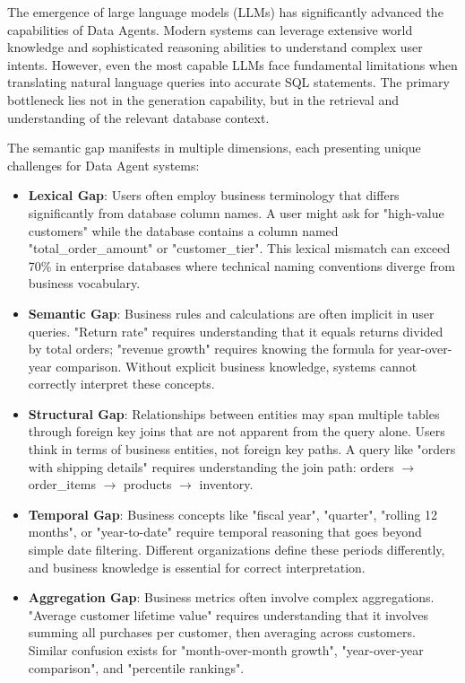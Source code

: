 \documentclass[sigconf, nonatbib]{acmart}
\begin{document}
The emergence of large language models (LLMs) has significantly advanced the capabilities of Data Agents. Modern systems can leverage extensive world knowledge and sophisticated reasoning abilities to understand complex user intents. However, even the most capable LLMs face fundamental limitations when translating natural language queries into accurate SQL statements. The primary bottleneck lies not in the generation capability, but in the retrieval and understanding of the relevant database context.

The semantic gap manifests in multiple dimensions, each presenting unique challenges for Data Agent systems:

\begin{itemize}
    \item \textbf{Lexical Gap}: Users often employ business terminology that differs significantly from database column names. A user might ask for "high-value customers" while the database contains a column named "total\_order\_amount" or "customer\_tier". This lexical mismatch can exceed 70\% in enterprise databases where technical naming conventions diverge from business vocabulary.
    
    \item \textbf{Semantic Gap}: Business rules and calculations are often implicit in user queries. "Return rate" requires understanding that it equals returns divided by total orders; "revenue growth" requires knowing the formula for year-over-year comparison. Without explicit business knowledge, systems cannot correctly interpret these concepts.
    
    \item \textbf{Structural Gap}: Relationships between entities may span multiple tables through foreign key joins that are not apparent from the query alone. Users think in terms of business entities, not foreign key paths. A query like "orders with shipping details" requires understanding the join path: orders $\rightarrow$ order\_items $\rightarrow$ products $\rightarrow$ inventory.
    
    \item \textbf{Temporal Gap}: Business concepts like "fiscal year", "quarter", "rolling 12 months", or "year-to-date" require temporal reasoning that goes beyond simple date filtering. Different organizations define these periods differently, and business knowledge is essential for correct interpretation.
    
    \item \textbf{Aggregation Gap}: Business metrics often involve complex aggregations. "Average customer lifetime value" requires understanding that it involves summing all purchases per customer, then averaging across customers. Similar confusion exists for "month-over-month growth", "year-over-year comparison", and "percentile rankings".
\end{itemize}
\end{document}
